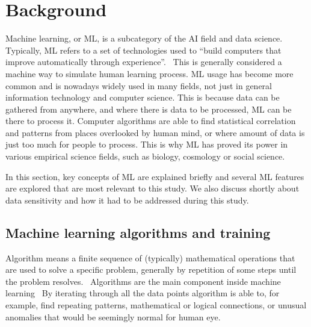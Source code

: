 

\section{Background}\label{sec:background}

Machine learning, or ML,
is a subcategory of the AI field and data science.
Typically, ML refers to
a set of technologies used to \enquote{build computers
that improve automatically through experience}.~\cite{jordan2015machine}
This is generally considered a machine way
to simulate human learning process.
ML usage has become more common
and is nowadays widely used in many fields,
not just in general information technology and computer science.
This is because data can be gathered from anywhere,
and where there is data to be processed,
ML can be there to process it.
Computer algorithms are able to find 
statistical correlation and patterns
from places overlooked by human mind,
or where amount of data is just too much 
for people to process.
This is why ML has proved its power
in various empirical science fields,
such as biology, cosmology or social science.~\cite{jordan2015machine}

In this section, 
key concepts of ML are explained briefly
and several ML features are explored 
that are most relevant to this study.
We also discuss shortly about data sensitivity
and how it had to be addressed during this study.



\subsection{Machine learning algorithms and training}\label{subsec:bg-machine-learning}

Algorithm means a finite sequence of (typically) mathematical operations
that are used to solve a specific problem,
generally by repetition of some steps
until the problem resolves.~\cite{merriam2022algorithm}
Algorithms are the main component inside machine learning~
By iterating through all the data points
algorithm is able to, for example,
find repeating patterns,
mathematical or logical connections,
or unusual anomalies that would be seemingly normal for human eye.

